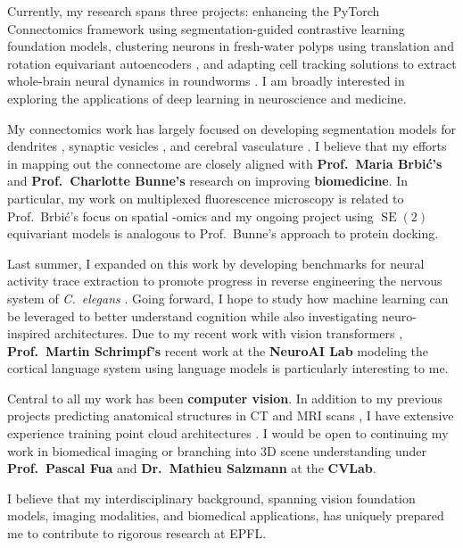 \documentclass[letterpaper,11pt]{article}
\begin{document}
Currently, my research spans three projects: enhancing the PyTorch Connectomics framework using segmentation-guided contrastive learning foundation models, clustering neurons in fresh-water polyps  using translation and rotation equivariant autoencoders , and adapting cell tracking solutions to extract whole-brain neural dynamics in roundworms . I am broadly interested in exploring the applications of deep learning in neuroscience and medicine.

My connectomics work has largely focused on developing segmentation models for dendrites , synaptic vesicles , and cerebral vasculature . I believe that my efforts in mapping out the connectome are closely aligned with \textbf{Prof.\ Maria Brbić’s} and \textbf{Prof.\ Charlotte Bunne’s} research on improving \textbf{biomedicine}. In particular, my work on multiplexed fluorescence microscopy  is related to Prof.\ Brbić’s focus on spatial -omics and my ongoing project using $\operatorname{SE}(2)$ equivariant models  is analogous to Prof.\ Bunne’s approach to protein docking.

Last summer, I expanded on this work by developing benchmarks for neural activity trace extraction to promote progress in reverse engineering the nervous system of \textit{C.\ elegans} . Going forward, I hope to study how machine learning can be leveraged to better understand cognition while also investigating neuro-inspired architectures. Due to my recent work with vision transformers , \textbf{Prof.\ Martin Schrimpf’s} recent work at the \textbf{NeuroAI Lab} modeling the cortical language system using language models is particularly interesting to me.

Central to all my work has been \textbf{computer vision}. In addition to my previous projects predicting anatomical structures in CT and MRI scans , I have extensive experience training point cloud architectures . I would be open to continuing my work in biomedical imaging or branching into 3D scene understanding under \textbf{Prof.\ Pascal Fua} and \textbf{Dr.\ Mathieu Salzmann} at the \textbf{CVLab}.

I believe that my interdisciplinary background, spanning vision foundation models, imaging modalities, and biomedical applications, has uniquely prepared me to contribute to rigorous research at EPFL.
\end{document}
